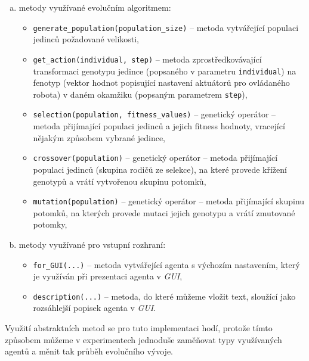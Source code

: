\begin{enumerate}[a)]
    \item metody využívané evolučním algoritmem:
        \begin{itemize}
            \item \texttt{generate\_population(population\_size)} -- metoda
                vytvářející populaci jedinců požadované velikosti,
            \item \texttt{get\_action(individual, step)} -- metoda
                zprostředkovávající transformaci genotypu jedince (popsaného v
                parametru \texttt{individual}) na fenotyp (vektor hodnot
                popisující nastavení aktuátorů pro ovládaného robota) v daném
                okamžiku (popsaným parametrem \texttt{step}),
            \item \texttt{selection(population, fitness\_values)} -- genetický
                operátor -- metoda přijímající populaci jedinců a jejich
                fitness hodnoty, vracející nějakým způsobem vybrané jedince,
            \item \texttt{crossover(population)} -- genetický operátor --
                metoda přijímající populaci jedinců (skupina rodičů ze
                selekce), na které provede křížení genotypů a vrátí vytvořenou
                skupinu potomků,
            \item \texttt{mutation(population)} -- genetický operátor -- metoda
                přijímající skupinu potomků, na kterých provede mutaci jejich
                genotypu a vrátí zmutované potomky,
        \end{itemize}
    \item metody využívané pro vstupní rozhraní:
        \begin{itemize}
            \item \texttt{for\_GUI(...)} -- metoda vytvářející agenta s
                výchozím nastavením, který je využíván při prezentaci agenta v
                \emph{GUI},
            \item \texttt{description(...)} -- metoda, do které můžeme vložit
                text, sloužící jako rozsáhlejší popisek agenta v \emph{GUI}.
        \end{itemize}
\end{enumerate}

Využití abstraktních metod se pro tuto implementaci hodí, protože tímto
způsobem můžeme v experimentech jednoduše zaměňovat typy využívaných
agentů a měnit tak průběh evolučního vývoje. 

